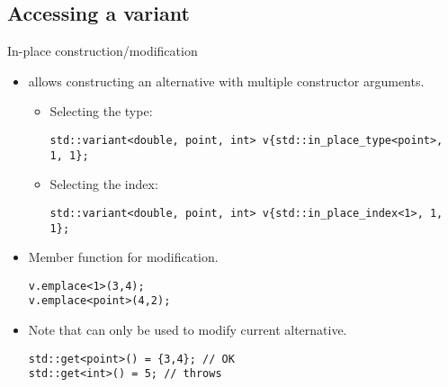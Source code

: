 \subsection{Accessing a variant}

\begin{frame}[t,fragile]{In-place construction/modification}
\begin{itemize}
  \item {} allows constructing an alternative
        with multiple constructor arguments.
    \begin{itemize}
      \item Selecting the type:
\begin{lstlisting}
std::variant<double, point, int> v{std::in_place_type<point>, 1, 1};
\end{lstlisting}

      \item Selecting the index:
\begin{lstlisting}
std::variant<double, point, int> v{std::in_place_index<1>, 1, 1};
\end{lstlisting}
    \end{itemize}

  \item Member function  for modification.
\begin{lstlisting}
v.emplace<1>(3,4);
v.emplace<point>(4,2);
\end{lstlisting}

  \item Note that  can only be used to modify current alternative.
\begin{lstlisting}
std::get<point>() = {3,4}; // OK
std::get<int>() = 5; // throws
\end{lstlisting}

\end{itemize}
\end{frame}


